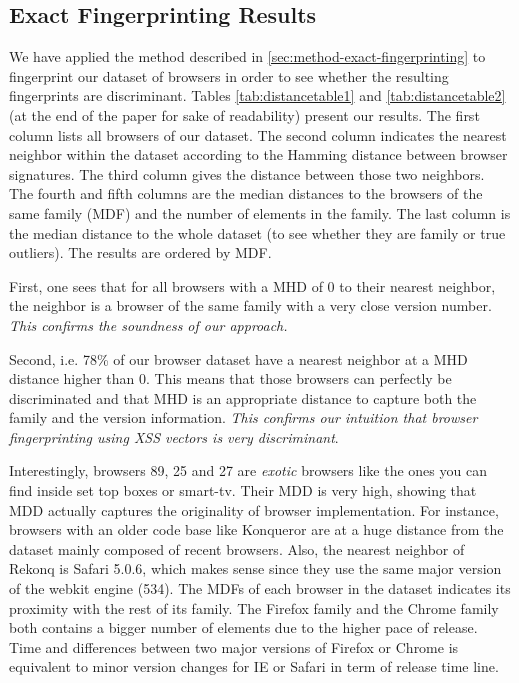\documentclass[10pt]{IEEEtran}
\begin{document}
\subsection{Exact Fingerprinting Results}
We have applied the method described in \ref{sec:method-exact-fingerprinting} to fingerprint 
our dataset of browsers in order to see whether the resulting fingerprints are discriminant.
Tables \ref{tab:distancetable1} and \ref{tab:distancetable2} (at the end of the paper for sake 
of readability) present our results.
The first column lists all browsers of our dataset. 
The second column indicates the nearest neighbor within the dataset according to the 
Hamming distance between browser signatures.
The third column gives the distance between those two neighbors.
The fourth and fifth columns are the median distances to the browsers of the same family (MDF) 
and the number of elements in the family. The last 
column is the median distance to the whole dataset (to see whether they are family or true outliers).
The results are ordered by MDF.




First, one sees that  for all browsers with a MHD of 0 to their nearest neighbor, the neighbor is 
a browser of the same family with a very close version number. 
\emph{This confirms the soundness of our approach.}




Second, i.e. 78\% of our browser dataset have a nearest neighbor 
at a MHD distance higher than 0.
This means that those browsers can perfectly be discriminated and that 
MHD is an appropriate distance to capture both the family and the version 
information.
\emph{This confirms our intuition that browser fingerprinting using XSS vectors is very 
discriminant}. 




Interestingly, browsers 89, 25 and 27 are \emph{exotic} browsers like the ones you can find inside set top boxes
or smart-tv. 
Their MDD is very high, showing that MDD actually captures the originality of browser 
implementation.
For instance, browsers with an older code base like Konqueror are at a huge distance from the dataset mainly 
composed of recent browsers.
Also, the nearest neighbor of Rekonq is Safari 5.0.6, which makes sense since they use the same major 
version of the webkit engine (534). 
The MDFs of each browser in the dataset indicates its proximity with the rest of its family. 
The Firefox family and the Chrome family both contains a bigger number of elements due to the 
higher pace of release. Time and differences between two major versions of Firefox or Chrome 
is equivalent to minor version changes for IE or Safari in term of release time line.
\end{document}

